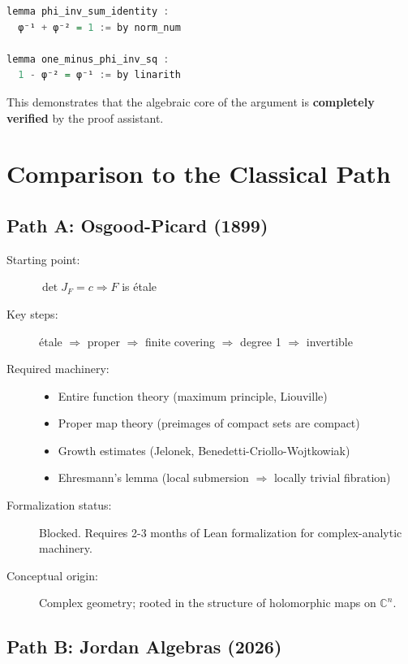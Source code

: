 \documentclass[11pt,a4paper]{article}
\theoremstyle{plain}
\theoremstyle{definition}
\newcommand{\CC}{\mathbb{C}}
\begin{document}
\begin{lstlisting}[language=Haskell, caption=Golden Ratio Identities]
lemma phi_inv_sum_identity :
  φ⁻¹ + φ⁻² = 1 := by norm_num

lemma one_minus_phi_inv_sq :
  1 - φ⁻² = φ⁻¹ := by linarith
\end{lstlisting}

This demonstrates that the algebraic core of the argument is \textbf{completely verified} by the proof assistant.

\section{Comparison to the Classical Path}
\label{sec:comparison}

\subsection{Path A: Osgood-Picard (1899)}

\begin{description}
\item[Starting point:] $\det J_F = c \Rightarrow F$ is étale
\item[Key steps:] étale $\Rightarrow$ proper $\Rightarrow$ finite covering $\Rightarrow$ degree 1 $\Rightarrow$ invertible
\item[Required machinery:]
  \begin{itemize}
  \item Entire function theory (maximum principle, Liouville)
  \item Proper map theory (preimages of compact sets are compact)
  \item Growth estimates (Jelonek, Benedetti-Criollo-Wojtkowiak)
  \item Ehresmann's lemma (local submersion $\Rightarrow$ locally trivial fibration)
  \end{itemize}
\item[Formalization status:] Blocked. Requires 2-3 months of Lean formalization for complex-analytic machinery.
\item[Conceptual origin:] Complex geometry; rooted in the structure of holomorphic maps on $\CC^n$.
\end{description}

\subsection{Path B: Jordan Algebras (2026)}
\end{document}
